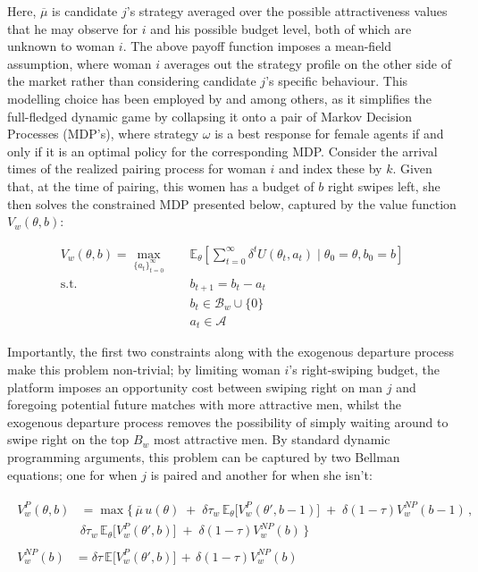 Here, $\overline\mu$ is candidate $j$'s strategy averaged over the possible attractiveness values that he may observe for $i$ and his possible budget level, both of which are unknown to woman $i$. The above payoff function imposes a mean-field assumption, where woman $i$ averages out the strategy profile on the other side of the market rather than considering candidate $j$'s specific behaviour. This modelling choice has been employed by \cite{immorlica2021designing} and \cite{iyer2014mean} among others, as it simplifies the full-fledged dynamic game by collapsing it onto a pair of Markov Decision Processes (MDP's), where strategy $\omega$ is a best response for female agents if and only if it is an optimal policy for the corresponding MDP. Consider the arrival times of the realized pairing process for woman $i$ and index these by $k$. Given that, at the time of pairing, this women has a budget of $b$ right swipes left, she then solves the constrained MDP presented below, captured by the value function $V_w(\theta,b)$:

\begin{equation}
    \begin{aligned} 
        V_w(\theta,b)=\max_{\{a_t\}^\infty_{t=0}} \quad & \mathbb{E}_{\theta}\left[\sum^\infty_{t=0} \delta^{t} U(\theta_t, a_t) \;|\; \theta_0=\theta, b_0=b\right]\\ 
        \textrm{s.t.} \quad & b_{t+1} = b_t -a_t \\
        & b_t\in \mathcal{B}_w \cup \{0\} \\
        & a_t\in \mathcal{A}  
    \end{aligned}
\end{equation}

Importantly, the first two constraints along with the exogenous departure process make this problem non-trivial; by limiting woman $i$'s right-swiping budget, the platform imposes an opportunity cost between swiping right on man $j$ and foregoing potential future matches with more attractive men, whilst the exogenous departure process removes the possibility of simply waiting around to swipe right on the top $B_w$ most attractive men. By standard dynamic programming arguments, this problem can be captured by two Bellman equations; one for when $j$ is paired and another for when she isn't:

\begin{align}
    \begin{split} 
        V^{P}_w(\theta,b) &=\max \Big\{ \, \overline{\mu}\, u(\theta) \;+\; \delta \tau_w \,\mathbb{E}_\theta \Big[V^P_w(\theta', b-1)\Big] \;+\; \delta (1-\tau)V^{NP}_w(b-1) \, ,\\  
        & \delta \tau_w \, \mathbb{E}_\theta\Big[ V^P_w(\theta', b) \Big] \;+\; \delta (1-\tau) V^{NP}_w(b) \, \Big\}
    \end{split}\\
    \begin{split}
        V^{NP}_w(b) &= {}\delta \tau \,\mathbb{E}\Big[ V^P_w(\theta', b)\Big] \,+\, \delta (1-\tau) V^{NP}_w(b)
    \end{split} 
\end{align} 

